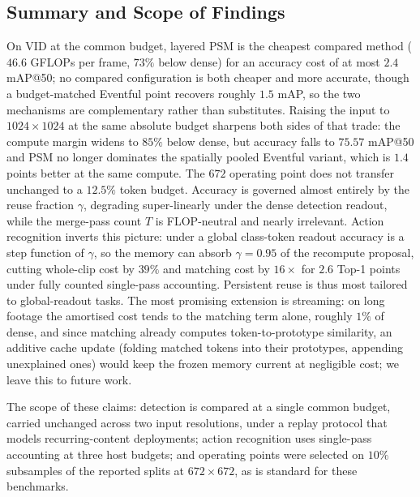 \subsection{Summary and Scope of Findings}
\label{sec:eval-summary}

On VID at the common budget, layered PSM is the cheapest compared method
($46.6$ GFLOPs per frame, $73\%$ below dense) for an accuracy cost of at
most $2.4$ mAP@50; no compared configuration is both cheaper and more
accurate, though a budget-matched Eventful point recovers roughly $1.5$
mAP, so the two mechanisms are complementary rather than substitutes.
Raising the input to $1024 \times 1024$ at the same absolute budget
sharpens both sides of that trade: the compute margin widens to $85\%$
below dense, but accuracy falls to $75.57$ mAP@50 and PSM no longer
dominates the spatially pooled Eventful variant, which is $1.4$ points
better at the same compute. The $672$ operating point does not transfer
unchanged to a $12.5\%$ token budget.
Accuracy is governed almost entirely by the reuse fraction $\gamma$,
degrading super-linearly under the dense detection readout, while the
merge-pass count $T$ is FLOP-neutral and nearly irrelevant. Action
recognition inverts this picture: under a global class-token readout
accuracy is a step function of $\gamma$, so the memory can absorb
$\gamma = 0.95$ of the recompute proposal, cutting whole-clip cost by
$39\%$ and matching cost by $16\times$ for $2.6$ Top-1 points under
fully counted single-pass accounting. Persistent reuse is thus most
tailored to global-readout tasks. The most promising extension is
streaming: on long footage the amortised cost tends to the matching term
alone, roughly $1\%$ of dense, and since matching already computes
token-to-prototype similarity, an additive cache update (folding matched
tokens into their prototypes, appending unexplained ones) would keep the
frozen memory current at negligible cost; we leave this to future work.

The scope of these claims: detection is compared at a single common
budget, carried unchanged across two input resolutions, under a replay
protocol that models recurring-content deployments; action recognition
uses single-pass accounting at three host budgets; and operating points
were selected on $10\%$ subsamples of the reported splits at
$672 \times 672$, as is standard for these benchmarks.




